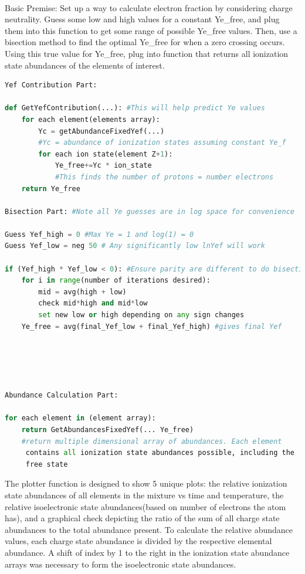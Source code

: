 \documentclass[11pt,a4paper]{article}
\begin{document}
\\
Basic Premise: Set up a way to calculate electron fraction by
considering charge neutrality. Guess some low and high values for a
constant Ye\_free, and plug them into this function to get some range
of possible Ye\_free values. Then, use a bisection method to find the
optimal Ye\_free for when a zero crossing occurs. Using this true
value for Ye\_free, plug into function that returns all ionization
state abundances of the elements of interest. 

\begin{lstlisting}[language=Python]
Yef Contribution Part: 

def GetYefContribution(...): #This will help predict Ye values
	for each element(elements array): 
		Yc = getAbundanceFixedYef(...)
		#Yc = abundance of ionization states assuming constant Ye_f
		for each ion state(element Z+1):
			Ye_free+=Yc * ion_state
			#This finds the number of protons = number electrons
	return Ye_free
			
Bisection Part: #Note all Ye guesses are in log space for convenience

Guess Yef_high = 0 #Max Ye = 1 and log(1) = 0
Guess Yef_low = neg 50 # Any significantly low lnYef will work

if (Yef_high * Yef_low < 0): #Ensure parity are different to do bisection
	for i in range(number of iterations desired):
		mid = avg(high + low)
		check mid*high and mid*low 
		set new low or high depending on any sign changes		
	Ye_free = avg(final_Yef_low + final_Yef_high) #gives final Yef
	
	
	
	
	
Abundance Calculation Part:

for each element in (element array):
	return GetAbundancesFixedYef(... Ye_free)
	#return multiple dimensional array of abundances. Each element
	 contains all ionization state abundances possible, including the
	 free state 
\end{lstlisting}

\vspace{.5 cm}
The plotter function is designed to show 5 unique plots: the relative ionization state abundances of all elements in the mixture vs time and temperature, the relative isoelectronic state abundances(based on number of electrons the atom has), and a graphical check depicting the ratio of the sum of all charge state abundances to the total abundance present. To calculate the relative abundance values, each charge state abundance is divided by the respective elemental abundance. A shift of index by 1 to the right in the ionization state abundance arrays was necessary to form the isoelectronic state abundances.
\end{document}
